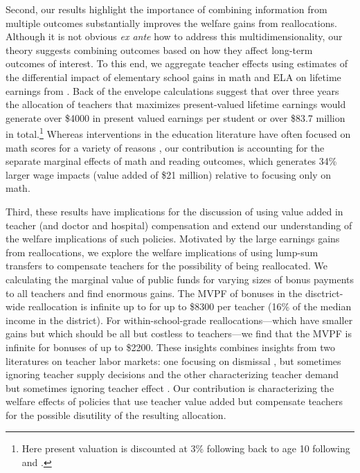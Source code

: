 \documentclass[12pt]{article}
\theoremstyle{definition}
\theoremstyle{definition}
\theoremstyle{definition}
\theoremstyle{definition}
\begin{document}
Second, our results highlight the importance of combining information from multiple outcomes substantially improves the welfare gains from reallocations. Although it is not obvious \textit{ex ante} how to address this multidimensionality, our theory suggests combining outcomes based on how they affect long-term outcomes of interest. To this end, we aggregate teacher effects using estimates of the differential impact of elementary school gains in math and ELA on lifetime earnings from \citet{chetty2014measuring2}. Back of the envelope calculations suggest that over three years the allocation of teachers that maximizes present-valued lifetime earnings would generate over \$4000 in present valued earnings per student or over \$83.7 million in total.\footnote{Here present valuation is discounted at 3\% following back to age 10 following \citet{krueger1999experimental} and \citet{chetty2014measuring2}.} Whereas interventions in the education literature have often focused on math scores for a variety of reasons \citep{chetty2014measuring1,Delgado2020,bates2022teacher}, our contribution is accounting for the separate marginal effects of math and reading outcomes, which generates 34\% larger wage impacts (value added of \$21 million) relative to focusing only on math. %

Third, these results have implications for the discussion of using value added in teacher (and doctor and hospital) compensation and extend our understanding of the welfare implications of such policies. Motivated by the large earnings gains from reallocations, we explore the welfare implications of using lump-sum transfers to compensate teachers for the possibility of being reallocated. We calculating the marginal value of public funds \citep[MVPF][]{Keyser_2020} for varying sizes of bonus payments to all teachers and find enormous gains. The MVPF of bonuses in the disctrict-wide reallocation is infinite up to for up to \$8300 per teacher (16\% of the median income in the district). For within-school-grade reallocations---which have smaller gains but which should be all but costless to teachers---we find that the MVPF is infinite for bonuses of up to \$2200.  These insights combines insights from two literatures on teacher labor markets: one focusing on dismissal \citep{hanushek2009teacher,staiger2010searching,chetty2014measuring1}, but sometimes ignoring teacher supply decisions \citep[as pointed out in][]{rothstein2010teacher} and the other characterizing teacher demand \citep{Johnson2021preferences} but sometimes ignoring teacher effect \citep[as addressed in][where both are combined]{bates2022teacher}. Our contribution is characterizing the welfare effects of policies that use teacher value added but compensate teachers for the possible disutility of the resulting allocation.
\end{document}
